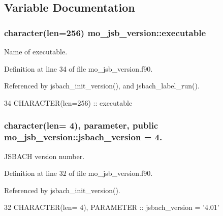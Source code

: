 \subsection{Variable Documentation}
\hypertarget{namespacemo__jsb__version_a8009d55d2d2f77172d38a83ad2b59efc}{}
\subsubsection[{executable}]{\setlength{\rightskip}{0pt plus 5cm}character(len=256) mo\+\_\+jsb\+\_\+version\+::executable}\label{namespacemo__jsb__version_a8009d55d2d2f77172d38a83ad2b59efc}


Name of executable. 



Definition at line 34 of file mo\+\_\+jsb\+\_\+version.\+f90.



Referenced by jsbach\+\_\+init\+\_\+version(), and jsbach\+\_\+label\+\_\+run().


\begin{DoxyCode}
34   \textcolor{keywordtype}{CHARACTER(len=256)} :: executable
\end{DoxyCode}
\hypertarget{namespacemo__jsb__version_acea3b0d7b36fbbac26065f23eff8584d}{}
\subsubsection[{jsbach\+\_\+version}]{\setlength{\rightskip}{0pt plus 5cm}character(len= 4), parameter, public mo\+\_\+jsb\+\_\+version\+::jsbach\+\_\+version = \textquotesingle{}4.\textquotesingle{}}\label{namespacemo__jsb__version_acea3b0d7b36fbbac26065f23eff8584d}


J\+S\+B\+A\+C\+H version number. 



Definition at line 32 of file mo\+\_\+jsb\+\_\+version.\+f90.



Referenced by jsbach\+\_\+init\+\_\+version().


\begin{DoxyCode}
32   \textcolor{keywordtype}{CHARACTER(len=  4)}, \textcolor{keywordtype}{PARAMETER} :: jsbach\_version = \textcolor{stringliteral}{'4.01'}
\end{DoxyCode}
\hypertarget{namespacemo__jsb__version_a65699e250219835c1bcfd563841df67b}{}
